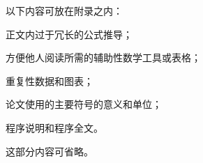 
%
%
%


以下内容可放在附录之内：

\begin{asparaenum}
\item 正文内过于冗长的公式推导；
\item 方便他人阅读所需的辅助性数学工具或表格；
\item 重复性数据和图表；
\item 论文使用的主要符号的意义和单位；
\item 程序说明和程序全文。
\end{asparaenum}

这部分内容可省略。

